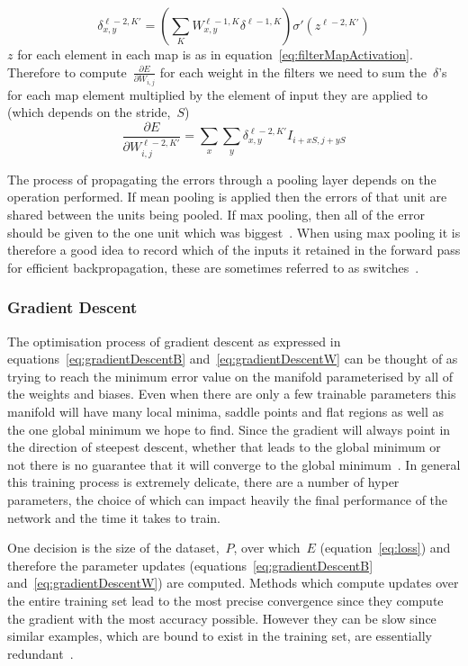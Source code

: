 \documentclass[11pt]{article} %
\begin{document}
\begin{equation}
\delta^{\ell-2,K'}_{x,y}=(\sum_{K} W^{\ell-1,K}_{x,y}\delta^{\ell-1,K})\sigma'(z^{\ell-2,K'})
\end{equation}
$z$ for each element in each map is as in equation~\ref{eq:filterMapActivation}. Therefore to compute~$\frac{\partial E}{\partial W_{i,j}}$ for each weight in the filters we need to sum the~$\delta$'s for each map element multiplied by the element of input they are applied to (which depends on the stride,~$S$)
\begin{equation}
\frac{\partial E}{\partial W^{\ell-2,K'}_{i,j}}=\sum_x\sum_y\delta^{\ell-2,K'}_{x,y}I_{i+xS,j+yS}
\end{equation}

The process of propagating the errors through a pooling layer depends on the operation performed. If mean pooling is applied then the errors of that unit are shared between the units being pooled. If max pooling, then all of the error should be given to the one unit which was biggest~\cite{gibiansky}. When using max pooling it is therefore a good idea to record which of the inputs it retained in the forward pass for efficient backpropagation, these are sometimes referred to as switches~\cite{KarLects}.


\subsubsection{Gradient Descent}
\label{sec:gradientDecsent}

The optimisation process of gradient descent as expressed in equations~\ref{eq:gradientDescentB} and~\ref{eq:gradientDescentW} can be thought of as trying to reach the minimum error value on the manifold parameterised by all of the weights and biases. Even when there are  only a few trainable parameters this manifold will have many local minima, saddle points and flat regions as well as the one global minimum we hope to find. Since the gradient will always point in the direction of steepest descent, whether that leads to the global minimum or not there is no guarantee that it will converge to the global minimum~\cite{LeCun1998a}. In general this training process is extremely delicate, there are a number of hyper parameters, the choice of which can impact heavily the final performance of the network and the time it takes to train.

One decision is the size of the dataset,~$P$, over which~$E$ (equation~\ref{eq:loss}) and therefore the parameter updates (equations~\ref{eq:gradientDescentB} and~\ref{eq:gradientDescentW}) are computed. Methods which compute updates over the entire training set lead to the most precise convergence since they compute the gradient with the most accuracy possible. However they can be slow since similar examples, which are bound to exist in the training set, are essentially redundant~\cite{LeCun1998a,Bottou2012}.
\end{document}
